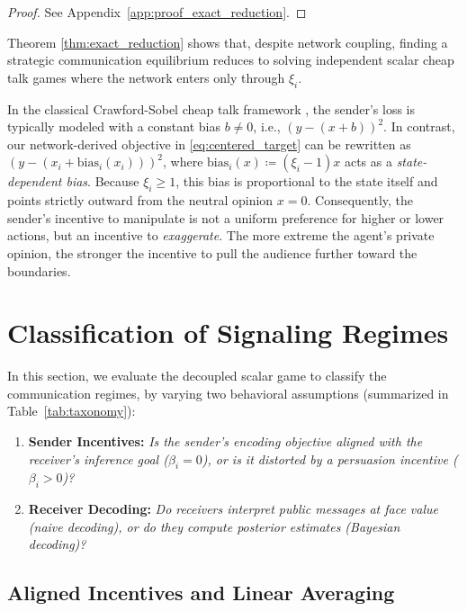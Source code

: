 \documentclass[journal,twoside,web]{ieeecolor}
\begin{document}
\begin{proof}
    See Appendix~\ref{app:proof_exact_reduction}.
\end{proof}

Theorem \ref{thm:exact_reduction} shows that, despite network coupling, finding a strategic communication equilibrium reduces to solving independent scalar cheap talk games where the network enters only through $\xi_i$.

\begin{remark}
    \label{rem:CS_connection}
    In the classical Crawford-Sobel cheap talk framework \cite{crawford1982strategic}, the sender's loss is typically modeled with a constant bias $b \neq 0$, i.e., $(y - (x+b))^2$. In contrast, our network-derived objective in \eqref{eq:centered_target} can be rewritten as $(y - (x_i + \mathrm{bias}_i(x_i)))^2$, where $\mathrm{bias}_i(x) \coloneqq (\xi_i - 1)x$ acts as a \emph{state-dependent bias}. Because $\xi_i \geq 1$, this bias is proportional to the state itself and points strictly outward from the neutral opinion $x=0$. Consequently, the sender's incentive to manipulate is not a uniform preference for higher or lower actions, but an incentive to \emph{exaggerate}. The more extreme the agent's private opinion, the stronger the incentive to pull the audience further toward the boundaries.
\end{remark}

\section{Classification of Signaling Regimes}
\label{sec:taxonomy}
In this section, we evaluate the decoupled scalar game to classify the communication regimes, by varying two behavioral assumptions (summarized in Table~\ref{tab:taxonomy}):
\begin{enumerate}[wide]
    \item \textbf{Sender Incentives:} \emph{Is the sender's encoding objective aligned with the receiver's inference goal ($\beta_i = 0$), or is it distorted by a persuasion incentive ($\beta_i > 0$)?}
    \item \textbf{Receiver Decoding:} \emph{Do receivers interpret public messages at face value (naive decoding), or do they compute posterior estimates (Bayesian decoding)?}
\end{enumerate}

\subsection{Aligned Incentives and Linear Averaging}
\label{subsec:aligned_incentives}
\end{document}
